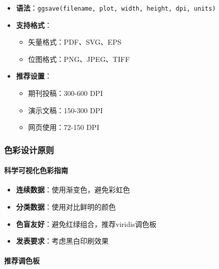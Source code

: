 \documentclass[
]{book}
\providecommand{\tightlist}{%
  \setlength{\itemsep}{0pt}\setlength{\parskip}{0pt}}
\begin{document}
\begin{itemize}
\tightlist
\item
  \textbf{语法}：\texttt{ggsave(filename,\ plot,\ width,\ height,\ dpi,\ units)}
\item
  \textbf{支持格式}：

  \begin{itemize}
  \tightlist
  \item
    矢量格式：PDF、SVG、EPS
  \item
    位图格式：PNG、JPEG、TIFF
  \end{itemize}
\item
  \textbf{推荐设置}：

  \begin{itemize}
  \tightlist
  \item
    期刊投稿：300-600 DPI
  \item
    演示文稿：150-300 DPI
  \item
    网页使用：72-150 DPI
  \end{itemize}
\end{itemize}

\hypertarget{ux8272ux5f69ux8bbeux8ba1ux539fux5219}{%
\subsubsection{色彩设计原则}\label{ux8272ux5f69ux8bbeux8ba1ux539fux5219}}

\hypertarget{ux79d1ux5b66ux53efux89c6ux5316ux8272ux5f69ux6307ux5357}{%
\paragraph{科学可视化色彩指南}\label{ux79d1ux5b66ux53efux89c6ux5316ux8272ux5f69ux6307ux5357}}

\begin{itemize}
\tightlist
\item
  \textbf{连续数据}：使用渐变色，避免彩虹色
\item
  \textbf{分类数据}：使用对比鲜明的颜色
\item
  \textbf{色盲友好}：避免红绿组合，推荐viridis调色板
\item
  \textbf{发表要求}：考虑黑白印刷效果
\end{itemize}

\hypertarget{ux63a8ux8350ux8c03ux8272ux677f}{%
\paragraph{推荐调色板}\label{ux63a8ux8350ux8c03ux8272ux677f}}
\end{document}
